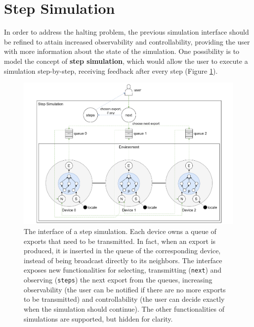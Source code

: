 
\section{Step Simulation}
\label{section:design:step-simulation}

In order to address the halting problem, the previous simulation interface
should be refined to attain increased observability and controllability,
providing the user with more information about the state of the simulation. One
possibility is to model the concept of \textbf{step simulation}, which would
allow the user to execute a simulation step-by-step, receiving feedback after
every step (Figure \ref{figure:step-simulation}).

\begin{figure}[!ht]
  \centering
  \includegraphics[width=1\textwidth]{resources/figures/step-simulation.pdf}
  \caption[The interface of a step simulation]{
    The interface of a step simulation. Each device owns a queue of exports
    that need to be transmitted. In fact, when an export is produced, it is
    inserted in the queue of the corresponding device, instead of being
    broadcast directly to its neighbors. The interface exposes new
    functionalities for selecting, transmitting (\texttt{next}) and observing
    (\texttt{steps}) the next export from the queues, increasing observability
    (the user can be notified if there are no more exports to be transmitted)
    and controllability (the user can decide exactly when the simulation should
    continue). The other functionalities of simulations are supported, but
    hidden for clarity.
  }
  \label{figure:step-simulation}
\end{figure}

